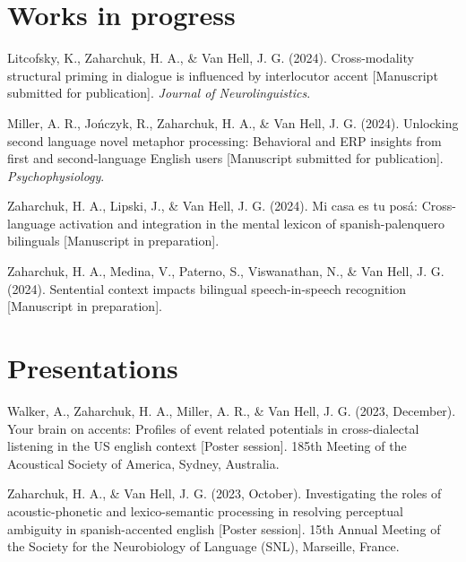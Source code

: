 \documentclass[11pt,a4paper,]{awesome-cv}
\begin{document}
\hypertarget{works-in-progress}{%
\section{Works in progress}\label{works-in-progress}}

\hypertarget{bibliography}{}
\leavevmode{}%
Litcofsky, K., Zaharchuk, H. A., \& Van Hell, J. G. (2024).
Cross-modality structural priming in dialogue is influenced by
interlocutor accent {[}Manuscript submitted for publication{]}.
\emph{Journal of Neurolinguistics}.

\leavevmode{}%
Miller, A. R., Jończyk, R., Zaharchuk, H. A., \& Van Hell, J. G. (2024).
Unlocking second language novel metaphor processing: Behavioral and ERP
insights from first and second-language English users {[}Manuscript
submitted for publication{]}. \emph{Psychophysiology}.

\leavevmode{}%
Zaharchuk, H. A., Lipski, J., \& Van Hell, J. G. (2024). Mi casa es tu
posá: Cross-language activation and integration in the mental lexicon of
spanish-palenquero bilinguals {[}Manuscript in preparation{]}.

\leavevmode{}%
Zaharchuk, H. A., Medina, V., Paterno, S., Viswanathan, N., \& Van Hell,
J. G. (2024). Sentential context impacts bilingual speech-in-speech
recognition {[}Manuscript in preparation{]}.

\hypertarget{presentations}{%
\section{Presentations}\label{presentations}}

\hypertarget{bibliography}{}
\leavevmode{}%
Walker, A., Zaharchuk, H. A., Miller, A. R., \& Van Hell, J. G. (2023,
December). Your brain on accents: Profiles of event related potentials
in cross-dialectal listening in the US english context {[}Poster
session{]}. 185th Meeting of the Acoustical Society of America, Sydney,
Australia.

\leavevmode{}%
Zaharchuk, H. A., \& Van Hell, J. G. (2023, October). Investigating the
roles of acoustic-phonetic and lexico-semantic processing in resolving
perceptual ambiguity in spanish-accented english {[}Poster session{]}.
15th Annual Meeting of the Society for the Neurobiology of Language
(SNL), Marseille, France.
\end{document}
